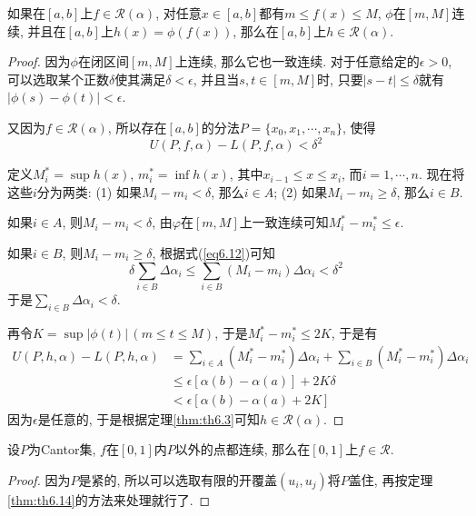 \documentclass[cn,12pt,math=mtpro2,citestyle=gb7714-2015,bibstyle=gb7714-2015,twocol]{elegantbook}
\newcommand{\RR}{\mathscr{R}}
\begin{document}
\begin{theorem}\label{thm:th6.5}
  如果在$[a,b]$上$f\in\mathscr{R}(\alpha)$, 对任意$x\in[a,b]$都有$m\leq f(x)\leq M$, $\phi$在$[m,M]$连续, 并且在$[a,b]$上$h(x)=\phi(f(x))$, 那么在$[a,b]$上$h\in\mathscr{R}(\alpha)$.
\end{theorem}
\begin{proof}
  因为$\phi$在闭区间$[m,M]$上连续, 那么它也一致连续. 对于任意给定的$\epsilon>0$, 可以选取某个正数$\delta$使其满足$\delta<\epsilon$, 并且当$s, t\in [m,M]$时, 只要$|s-t|\leq\delta$就有$|\phi(s)-\phi(t)|<\epsilon$.

  又因为$f\in\mathscr{R}(\alpha)$, 所以存在$[a,b]$的分法$P=\{x_0,x_1,\cdots,x_n\}$, 使得
  \begin{equation}\label{eq6.12}
    U(P,f,\alpha)-L(P,f,\alpha)<\delta^2
  \end{equation}

  定义$M_i^\ast=\sup h(x)$, $m_i^\ast=\inf h(x)$, 其中$x_{i-1}\leq x\leq x_i$, 而$i=1,\cdots,n$. 现在将这些$i$分为两类: (1) 如果$M_i-m_i<\delta$, 那么$i\in A$; (2) 如果$M_i-m_i\geq\delta$, 那么$i\in B$.

  如果$i\in A$, 则$M_i-m_i<\delta$, 由$\varphi$在$[m,M]$上一致连续可知$M_i^\ast-m_i^\ast\leq\epsilon$.

  如果$i\in B$, 则$M_i-m_i\geq\delta$, 根据式(\ref{eq6.12})可知
  $$\delta\sum_{i\in B}\Delta\alpha_i\leq\sum_{i\in B}(M_i-m_i)\Delta\alpha_i<\delta^2$$
  于是$\displaystyle\sum_{i\in B}\Delta\alpha_i<\delta$.

  再令$K=\sup|\phi(t)|\,(m\leq t\leq M)$, 于是$M_i^\ast-m_i^\ast\leq 2K$, 于是有
  \begin{align*}
  U(P,h,\alpha)-L(P,h,\alpha)&=\sum_{i\in A}(M_i^\ast-m_i^\ast)\Delta\alpha_i+\sum_{i\in B}(M_i^\ast-m_i^\ast)\Delta\alpha_i \\
  &\leq\epsilon[\alpha(b)-\alpha(a)]+2K\delta \\
  &<\epsilon[\alpha(b)-\alpha(a)+2K]
  \end{align*}
  因为$\epsilon$是任意的, 于是根据定理\ref{thm:th6.3}可知$h\in\mathscr{R}(\alpha)$.

\end{proof}
\begin{example}
设$P$为Cantor集, $f$在$[0,1]$内$P$以外的点都连续, 那么在$[0,1]$上$f\in\RR$.
\end{example}
\begin{proof}
  因为$P$是紧的, 所以可以选取有限的开覆盖$(u_i,u_j)$将$P$盖住, 再按定理\ref{thm:th6.14}的方法来处理就行了.
\end{proof}
\end{document}
